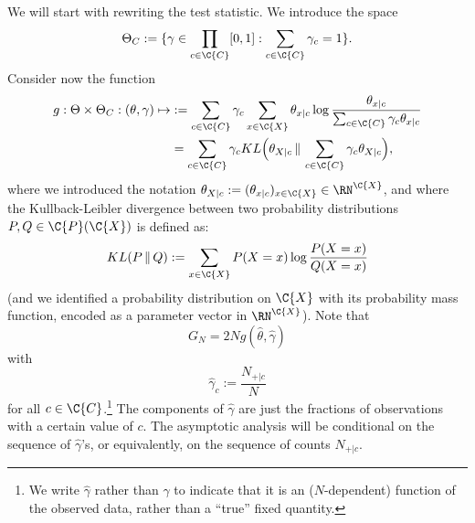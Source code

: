 We will start with rewriting the test statistic. We introduce the space
$$\Theta_C := \{ \gamma \in \prod_{c\in\C{C}} [0,1] : \sum_{c\in\C{C}} \gamma_c = 1 \}.$$
Consider now the function
\begin{equation}\label{eq:G_test_statistics_limit}
  \begin{split}
  g : \Theta \times \Theta_C : (\theta,\gamma) \mapsto
    &:= \sum_{c\in\C{C}} \gamma_c \sum_{x\in\C{X}} \theta_{x|c} \log \frac{\theta_{x|c}}{\sum_{c\in\C{C}} \gamma_c \theta_{x|c}} \\
    & = \sum_{c\in\C{C}} \gamma_c KL\Big(\theta_{X|c} \,\Vert\, \sum_{c\in\C{C}} \gamma_c \theta_{X|c}\Big),
\end{split}\end{equation}
where we introduced the notation $\theta_{X|c} := (\theta_{x|c})_{x\in\C{X}} \in \RN^{\C{X}}$, and where
the Kullback-Leibler divergence between two probability distributions $P,Q \in \C{P}(\C{X})$ is defined as:
$$KL(P \,\Vert\, Q) := \sum_{x\in\C{X}} P(X=x) \log \frac{P(X=x)}{Q(X=x)}$$
(and we identified a probability distribution on $\C{X}$ with its probability mass function, encoded as a parameter vector in 
$\RN^\C{X}$).
Note that
$$G_N = 2 N g(\hat\theta, \hat\gamma)$$
with
$$\hat\gamma_c := \frac{N_{+|c}}{N}$$
for all $c\in\C{C}$.\footnote{We write $\hat\gamma$ rather than $\gamma$ to indicate that it is an ($N$-dependent) function of the observed data, rather than a ``true'' fixed quantity.}
The components of $\hat\gamma$ are just the fractions of observations with a certain value of $c$. 
The asymptotic analysis will be conditional on the sequence of $\hat\gamma$'s, or equivalently,
on the sequence of counts $N_{+|c}$.

